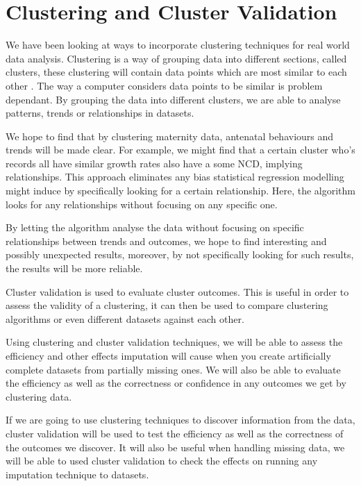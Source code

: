 \documentclass[bsc]{abdnthesis}
\begin{document}
\section{Clustering and Cluster Validation} %
\label{sec:clustering_and_cluster_validation}
We have been looking at ways to incorporate clustering techniques for real world data analysis.  Clustering is a way of grouping data into different sections, called clusters, these clustering will contain data points which are most similar to each other \cite{ cluster}. The way a computer considers data points to be similar is problem dependant. By grouping the data into different clusters, we are able to analyse patterns, trends or relationships in datasets. 

We hope to find that by clustering maternity data, antenatal behaviours and trends will be made clear. For example, we might find that a certain cluster who's records all have similar growth rates also have a some NCD, implying relationships. This approach eliminates any bias statistical regression modelling might induce by specifically looking for a certain relationship. Here, the algorithm looks for any relationships without focusing on any specific one. 

By letting the algorithm analyse the data without focusing on specific relationships between trends and outcomes, we hope to find interesting and possibly unexpected results, moreover, by not specifically looking for such results, the results will be more reliable. 

Cluster validation is used to evaluate cluster outcomes\cite{ cluster-val}. This is useful in order to assess the validity of a clustering, it can then be used to compare clustering algorithms or even different datasets against each other. 

Using clustering and cluster validation techniques, we will be able to assess the efficiency and other effects imputation will cause when you create artificially complete datasets from partially missing ones. We will also be able to evaluate the efficiency as well as the correctness or confidence in any outcomes we get by clustering data. 

If we are going to use clustering techniques to discover information from the data, cluster validation will be used to test the efficiency as well as the correctness of the outcomes we discover. It will also be useful when handling missing data, we will be able to used cluster validation to check the effects on running any imputation technique to datasets.  
\end{document}
